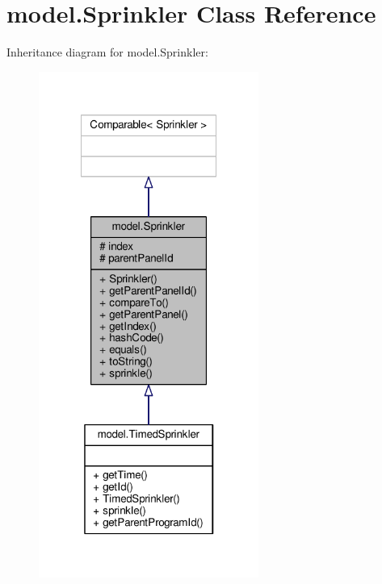 \hypertarget{classmodel_1_1Sprinkler}{\section{model.\-Sprinkler Class Reference}
\label{classmodel_1_1Sprinkler}
}


Inheritance diagram for model.\-Sprinkler\-:\nopagebreak
\begin{figure}[H]
\begin{center}
\leavevmode
\includegraphics[width=204pt]{classmodel_1_1Sprinkler__inherit__graph}
\end{center}
\end{figure}


